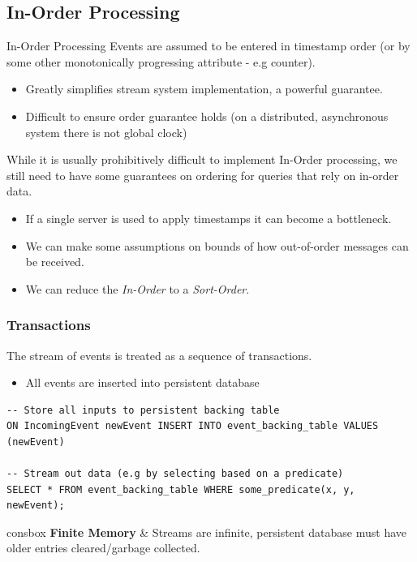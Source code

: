 \subsection{In-Order Processing}
\begin{definitionbox}{In-Order Processing}
    Events are assumed to be entered in timestamp order (or by some other monotonically progressing attribute - e.g counter).
    \begin{itemize}
        \item Greatly simplifies stream system implementation, a powerful guarantee.
        \item Difficult to ensure order guarantee holds (on a distributed, asynchronous system there is not global clock)
    \end{itemize}
\end{definitionbox}
While it is usually prohibitively difficult to implement In-Order processing, we still need to have some guarantees on ordering for queries that rely on in-order data.
\begin{itemize}
    \item If a single server is used to apply timestamps it can become a bottleneck.
    \item We can make some assumptions on bounds of how out-of-order messages can be received.
    \item We can reduce the \textit{In-Order} to a \textit{Sort-Order}.
\end{itemize}

\subsubsection{Transactions}
The stream of events is treated as a sequence of transactions.
\begin{itemize}
    \item All events are inserted into persistent database
\end{itemize}
\begin{verbatim}
-- Store all inputs to persistent backing table
ON IncomingEvent newEvent INSERT INTO event_backing_table VALUES (newEvent)

-- Stream out data (e.g by selecting based on a predicate)
SELECT * FROM event_backing_table WHERE some_predicate(x, y, newEvent);
\end{verbatim}
\begin{tabbox}{consbox}
    \textbf{Finite Memory} & Streams are infinite, persistent database must have older entries cleared/garbage collected. \\
\end{tabbox}

